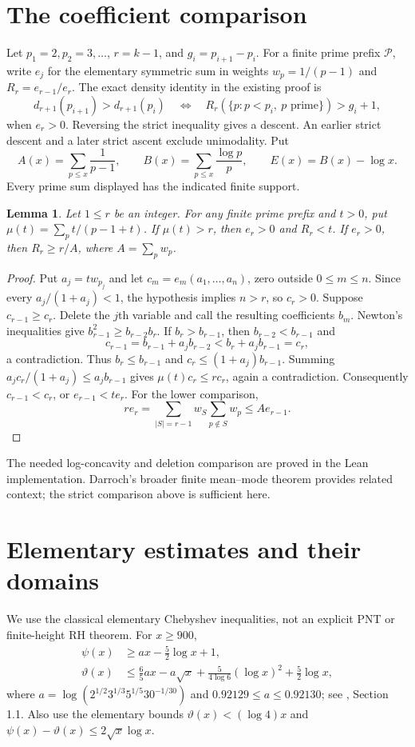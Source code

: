 \documentclass[11pt]{article}
\newtheorem{lemma}[theorem]{Lemma}
\begin{document}
\section{The coefficient comparison}
Let $p_1=2,p_2=3,\ldots$, $r=k-1$, and $g_i=p_{i+1}-p_i$.
For a finite prime prefix $\mathcal P$, write $e_j$ for the elementary
symmetric sum in weights $w_p=1/(p-1)$ and $R_r=e_{r-1}/e_r$.
The exact density identity in the existing proof is
\[
 d_{r+1}(p_{i+1})>d_{r+1}(p_i)
 \quad\Longleftrightarrow\quad
 R_r(\{p:p<p_i,\ p\text{ prime}\})>g_i+1,
\]
when $e_r>0$. Reversing the strict inequality gives a descent.
An earlier strict descent and a later strict ascent exclude unimodality.
Put
\[
 A(x)=\sum_{p\le x}\frac1{p-1},\qquad
 B(x)=\sum_{p\le x}\frac{\log p}{p},\qquad E(x)=B(x)-\log x .
\]
Every prime sum displayed has the indicated finite support.

\begin{lemma}\label{mode}
Let $1\le r$ be an integer. For any finite prime prefix and $t>0$, put
$\mu(t)=\sum_p t/(p-1+t)$.
If $\mu(t)>r$, then $e_r>0$ and $R_r<t$.
If $e_r>0$, then $R_r\ge r/A$, where $A=\sum_p w_p$.
\end{lemma}
\begin{proof}
Put $a_j=tw_{p_j}$ and let $c_m=e_m(a_1,\ldots,a_n)$, zero outside
$0\le m\le n$. Since every $a_j/(1+a_j)<1$, the hypothesis implies
$n>r$, so $c_r>0$.
Suppose $c_{r-1}\ge c_r$. Delete the $j$th variable and call the
resulting coefficients $b_m$. Newton's inequalities give
$b_{r-1}^2\ge b_{r-2}b_r$.
If $b_r>b_{r-1}$, then $b_{r-2}<b_{r-1}$ and
\[
 c_{r-1}=b_{r-1}+a_jb_{r-2}
       <b_r+a_jb_{r-1}=c_r,
\]
a contradiction. Thus $b_r\le b_{r-1}$ and
$c_r\le(1+a_j)b_{r-1}$. Summing
$a_jc_r/(1+a_j)\le a_jb_{r-1}$ gives
$\mu(t)c_r\le r c_r$, again a contradiction.
Consequently $c_{r-1}<c_r$, or $e_{r-1}<t e_r$.
For the lower comparison,
\[
 r e_r=\sum_{|S|=r-1}w_S\sum_{p\notin S}w_p\le A e_{r-1}.
\]
\end{proof}
The needed log-concavity and deletion comparison are proved in the Lean
implementation. Darroch's broader finite mean--mode theorem
\cite{darroch,gnedin} provides related context; the strict comparison above
is sufficient here.

\section{Elementary estimates and their domains}
We use the classical elementary Chebyshev inequalities, not an explicit
PNT or finite-height RH theorem. For $x\ge900$,
\begin{align}
 \psi(x)&\ge a x-\tfrac52\log x+1,\label{classlow}\\
 \vartheta(x)&\le\tfrac65a x-a\sqrt x+
 \frac5{4\log6}(\log x)^2+\tfrac52\log x,\label{classup}
\end{align}
where
$a=\log(2^{1/2}3^{1/3}5^{1/5}30^{-1/30})$ and
$0.92129\le a\le0.92130$; see \cite{cheb}, Section 1.1.
Also use the elementary bounds
$\vartheta(x)<(\log4)x$ and
$\psi(x)-\vartheta(x)\le2\sqrt x\log x$.
\end{document}
